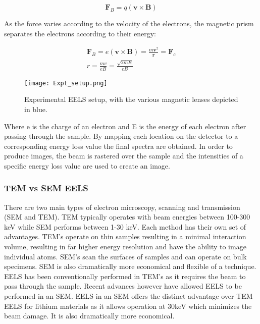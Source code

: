 \begin{equation}
	\textbf{F}_B = q (\textbf{v} \times \textbf{B})
\end{equation}

As the force varies according to the velocity of the electrons, the magnetic prism  separates the electrons according to their energy: 

\begin{gather}
\textbf{F}_B = e (\textbf{v} \times \textbf{B}) =  \frac{m \textbf{v}^2}{\textbf{r}} = \textbf{F}_c \\
 r =  \frac{mv}{eB} = \frac{\sqrt{2mE}}{eB}
\end{gather}

\begin{figure}
 \centering
 \texttt{[image: Expt\_setup.png]}
 \caption{Experimental EELS setup, with the various magnetic lenses depicted in blue.  }
 \label{prism}
 
\end{figure}

Where e is the charge of an electron and E is the energy of each electron after passing through the sample.  By mapping each location on the detector to a corresponding energy loss value the final spectra are obtained. In order to produce images, the beam is rastered over the sample and the intensities of a specific energy loss value are used to create an image. 

\subsubsection{TEM vs SEM EELS}
There are two main types of electron microscopy, scanning and transmission (SEM and TEM).  TEM typically operates with beam energies between 100-300 keV while SEM performs between 1-30 keV.  Each method has their own set of advantages.  TEM's operate on thin samples resulting in a minimal interaction volume, resulting in far higher energy resolution and have the ability to image individual atoms. SEM's scan the surfaces of samples and can operate on bulk specimens.  SEM is also dramatically more economical and flexible of a technique.   EELS has been conventionally performed in TEM's as it requires the beam to pass through the sample. Recent advances however have allowed EELS to be performed in an SEM.   EELS in an SEM offers the distinct advantage over TEM EELS for lithium materials as it allows operation at 30keV which minimizes the beam damage.  It is also dramatically more economical.   


